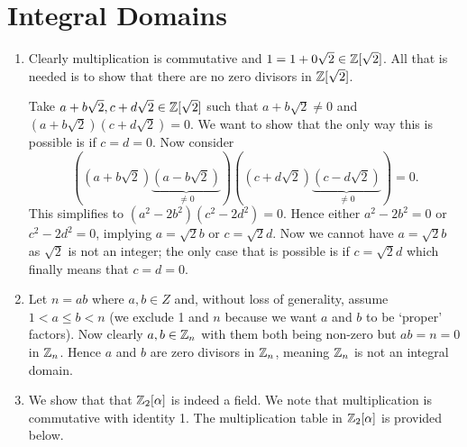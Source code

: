 \section{Integral Domains}
\begin{enumerate}
    \item Clearly multiplication is commutative and $1 = 1 + 0\sqrt2 \in \mathbb{Z}[\sqrt2]$. All that is needed is to show that there are no zero divisors in $\mathbb{Z}[\sqrt2]$.
    
    Take $a+b\sqrt2, c+d\sqrt2 \in \mathbb{Z}[\sqrt2]$ such that $a+b\sqrt2 \neq 0$ and $(a+b\sqrt2)(c+d\sqrt2) = 0$. We want to show that the only way this is possible is if $c = d = 0$. Now consider
    \[
        \left((a+b\sqrt2)\underbrace{(a-b\sqrt2)}_{\neq 0}\right)\left((c+d\sqrt2)\underbrace{(c-d\sqrt2)}_{\neq 0}\right) = 0.
    \]
    This simplifies to $(a^2-2b^2)(c^2-2d^2) = 0$. Hence either $a^2-2b^2 = 0$ or $c^2-2d^2 = 0$, implying $a = \sqrt2b$ or $c = \sqrt2d$. Now we cannot have $a = \sqrt2b$ as $\sqrt2$ is not an integer; the only case that is possible is if $c = \sqrt2d$ which finally means that $c = d = 0$.

    \item Let $n = ab$ where $a,b \in Z$ and, without loss of generality, assume $1 < a \leq b < n$ (we exclude 1 and $n$ because we want $a$ and $b$ to be `proper' factors). Now clearly $a, b \in \mathbb{Z}_n$ with them both being non-zero but $ab = n = 0$ in $\mathbb{Z}_n$. Hence $a$ and $b$ are zero divisors in $\mathbb{Z}_n$, meaning $\mathbb{Z}_n$ is not an integral domain.
    
    \item We show that that $\mathbb{Z}_2[\alpha]$ is indeed a field. We note that multiplication is commutative with identity 1. The multiplication table in $\mathbb{Z}_2[\alpha]$ is provided below.
    \begin{table}[h]
        \centering
    \end{table}


\end{enumerate}
